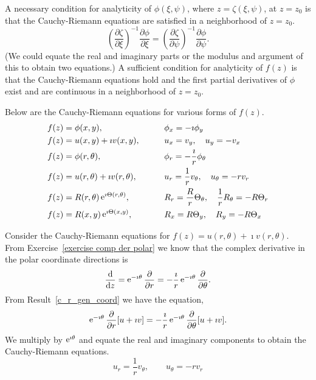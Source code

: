 \begin{Result}
  \label{c_r_gen_coord}
  A necessary condition for analyticity of $\phi(\xi, \psi)$, where
  $z = \zeta(\xi, \psi)$, at $z = z_0$ is that the Cauchy-Riemann equations
  are satisfied in a neighborhood of $z=z_0$.  
  \[
  \left( \frac{\partial \zeta}{\partial \xi} \right)^{-1} \frac{\partial \phi}{\partial \xi}
  = \left( \frac{\partial \zeta}{\partial \psi} \right)^{-1} \frac{\partial \phi}{\partial \psi}.
  \]
  (We could equate the real and imaginary parts or the modulus and
  argument of this to obtain two equations.)  A sufficient condition
  for analyticity of $f(z)$ is that the Cauchy-Riemann equations
  hold and the first partial derivatives of $\phi$ exist and are
  continuous in a neighborhood of $z=z_0$.

  Below are the Cauchy-Riemann equations for various forms of $f(z)$.
  \begin{alignat*}{2}
    &f(z) = \phi(x,y), &\qquad
    &\phi_x = -\imath \phi_y
    \\
    &f(z) = u(x,y) + \imath v(x,y), &\qquad
    &u_x = v_y, \quad u_y = - v_x
    \\
    &f(z) = \phi(r,\theta), &\qquad
    &\phi_r = - \frac{\imath}{r} \phi_\theta
    \\
    &f(z) = u(r, \theta) + \imath v(r, \theta), &\qquad
    &u_r = \frac{1}{r} v_\theta, \quad u_\theta = - r v_r
    \\
    &f(z) = R(r, \theta) \mathop{\mathrm{e}}\nolimits^{\imath \Theta(r,\theta)}, &\qquad
    &R_r = \frac{R}{r} \Theta_\theta, \quad \frac{1}{r} R_\theta = -R \Theta_r
    \\
    &f(z) = R(x,y) \mathop{\mathrm{e}}\nolimits^{\imath \Theta(x,y)}, &\qquad
    &R_x = R \Theta_y, \quad R_y = - R \Theta_x
  \end{alignat*}
\end{Result}





\begin{Example}
  Consider the Cauchy-Riemann equations for 
  $f(z) = u(r, \theta) + \imath v(r, \theta)$.  From Exercise~\ref{exercise comp der polar}
  we know that the complex derivative in the polar coordinate directions is
  \[
  \frac{\mathrm{d}}{\mathrm{d} z} = \mathop{\mathrm{e}}\nolimits^{-\imath \theta} \frac{\partial}{\partial r} 
  = - \frac{\imath}{r} \mathop{\mathrm{e}}\nolimits^{-\imath \theta} \frac{\partial}{\partial \theta}.
  \]
  From Result~\ref{c_r_gen_coord} we have the equation,
  \[
  \mathop{\mathrm{e}}\nolimits^{-\imath \theta} \frac{\partial}{\partial r} [ u + \imath v ] 
  = - \frac{\imath}{r} \mathop{\mathrm{e}}\nolimits^{-\imath \theta} \frac{\partial}{\partial \theta} [ u + \imath v ].
  \]
  We multiply by $\mathop{\mathrm{e}}\nolimits^{\imath \theta}$ and equate the real and imaginary components
  to obtain the Cauchy-Riemann equations.
  \[
  u_r = \frac{1}{r} v_\theta, \qquad u_\theta = -r v_r
  \]
\end{Example}









